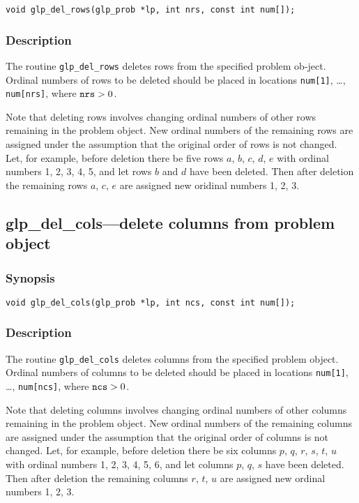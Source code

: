 \begin{verbatim}
void glp_del_rows(glp_prob *lp, int nrs, const int num[]);
\end{verbatim}

\subsubsection*{Description}

The routine \verb|glp_del_rows| deletes rows from the specified problem
ob-\linebreak ject. Ordinal numbers of rows to be deleted should be
placed in locations \verb|num[1]|, \dots, \verb|num[nrs]|, where
${\tt nrs}>0$.

Note that deleting rows involves changing ordinal numbers of other
rows remaining in the problem object. New ordinal numbers of the
remaining rows are assigned under the assumption that the original
order of rows is not changed. Let, for example, before deletion there
be five rows $a$, $b$, $c$, $d$, $e$ with ordinal numbers 1, 2, 3, 4, 5,
and let rows $b$ and $d$ have been deleted. Then after deletion the
remaining rows $a$, $c$, $e$ are assigned new oridinal numbers 1, 2, 3.

\subsection{glp\_del\_cols---delete columns from problem object}

\subsubsection*{Synopsis}

\begin{verbatim}
void glp_del_cols(glp_prob *lp, int ncs, const int num[]);
\end{verbatim}

\subsubsection*{Description}

The routine \verb|glp_del_cols| deletes columns from the specified
problem object. Ordinal numbers of columns to be deleted should be
placed in locations \verb|num[1]|, \dots, \verb|num[ncs]|, where
${\tt ncs}>0$.

Note that deleting columns involves changing ordinal numbers of other
columns remaining in the problem object. New ordinal numbers of the
remaining columns are assigned under the assumption that the original
order of columns is not changed. Let, for example, before deletion there
be six columns $p$, $q$, $r$, $s$, $t$, $u$ with ordinal numbers 1, 2,
3, 4, 5, 6, and let columns $p$, $q$, $s$ have been deleted. Then after
deletion the remaining columns $r$, $t$, $u$ are assigned new ordinal
numbers 1, 2, 3.

